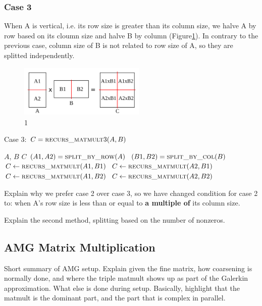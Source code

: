 \subsubsection{Case 3}
\label{sec:case3}
When A is vertical, i.e. its row size is greater than its column size, we halve A by row based on its cloumn size and halve B by column (Figure\ref{fig:case3}). In contrary to the previous case, column size of B is not related to row size of A, so they are splitted independently.

\begin{figure}[tbh]
 \centering
 \includegraphics[width=6cm,height=2.5cm]{./figures/case3_001.pdf}
 \caption{1}
 \label{fig:case3}
\end{figure}

\begin{algorithm}[H] 
  \caption{Case 3: $C = \textsc{recurs\_matmult}3(A, B)$} \label{alg:case3} 
  \begin{algorithmic}[1]
    \Require $A$, $B$
    \Ensure  $C$
    \State $(A1, A2) = \textsc{split\_by\_row}(A)$
    \State $(B1, B2) = \textsc{split\_by\_col}(B)$
    \State $C \leftarrow \textsc{recurs\_matmult}(A1,B1)$
    \State $C \leftarrow \textsc{recurs\_matmult}(A2,B1)$
    \State $C \leftarrow \textsc{recurs\_matmult}(A1,B2)$
    \State $C \leftarrow \textsc{recurs\_matmult}(A2,B2)$
  \end{algorithmic}
\end{algorithm}

Explain why we prefer case 2 over case 3, so we have changed condition for case 2 to: when A's row size is less than or equal to \textbf{a multiple of} its column size.

Explain the second method, splitting based on the number of nonzeros.


\subsection{AMG Matrix Multiplication}
\label{sec:amg}

Short summary of AMG setup. Explain given the fine matrix, how coarsening is normally done, and where the triple matmult shows up as part of the Galerkin approximation. What else is done during setup. Basically, highlight that the matmult is the dominant part, and the part that is complex in parallel. 


